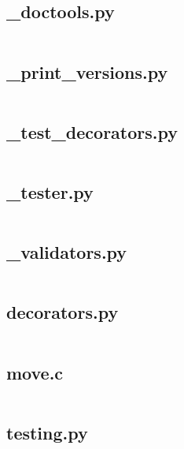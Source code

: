 \documentclass{article}
\begin{document}
\subsection{\_doctools.py}
\inputminted{python}{/home/dufferzafar/dev/@clones/pandas/pandas/util/_doctools.py}
\newpage

\subsection{\_print\_versions.py}
\inputminted{python}{/home/dufferzafar/dev/@clones/pandas/pandas/util/_print_versions.py}
\newpage

\subsection{\_test\_decorators.py}
\inputminted{python}{/home/dufferzafar/dev/@clones/pandas/pandas/util/_test_decorators.py}
\newpage

\subsection{\_tester.py}
\inputminted{python}{/home/dufferzafar/dev/@clones/pandas/pandas/util/_tester.py}
\newpage

\subsection{\_validators.py}
\inputminted{python}{/home/dufferzafar/dev/@clones/pandas/pandas/util/_validators.py}
\newpage

\subsection{decorators.py}
\inputminted{python}{/home/dufferzafar/dev/@clones/pandas/pandas/util/decorators.py}
\newpage

\subsection{move.c}
\inputminted{c}{/home/dufferzafar/dev/@clones/pandas/pandas/util/move.c}
\newpage

\subsection{testing.py}
\inputminted{python}{/home/dufferzafar/dev/@clones/pandas/pandas/util/testing.py}
\newpage


\end{document}

